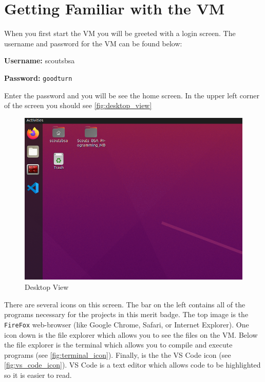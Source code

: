     \FloatBarrier

  \section{Getting Familiar with the VM}
  \label{sec:getting_familiar_with_vm}

    When you first start the VM you will be greeted with a login screen.
    The username and password for the VM can be found below:


    \vspace{5pt}
    \begin{mdframed}[]
      \textbf{Username:} scoutsbsa

      \textbf{Password:} \texttt{goodturn} 
    \end{mdframed}

    Enter the password and you will be see the home screen.
    In the upper left corner of the screen you should see \autoref{fig:desktop_view}

    \begin{figure}[ht]
      \centering
      \includegraphics[width=0.8\linewidth]{desktop.png}
      \caption{Desktop View}
      \label{fig:desktop_view}
    \end{figure}

    \FloatBarrier

    There are several icons on this screen.
    The bar on the left contains all of the programs necessary for the projects in this merit badge.
    The top image is the \texttt{FireFox} web-browser (like Google Chrome, Safari, or Internet Explorer).
    One icon down is the file explorer which allows you to see the files on the VM.
    Below the file explorer is the terminal which allows you to compile and execute programs (see \autoref{fig:terminal_icon}).
    Finally, is the the VS Code icon (see \autoref{fig:vs_code_icon}).
    VS Code is a text editor which allows code to be highlighted so it is easier to read.

